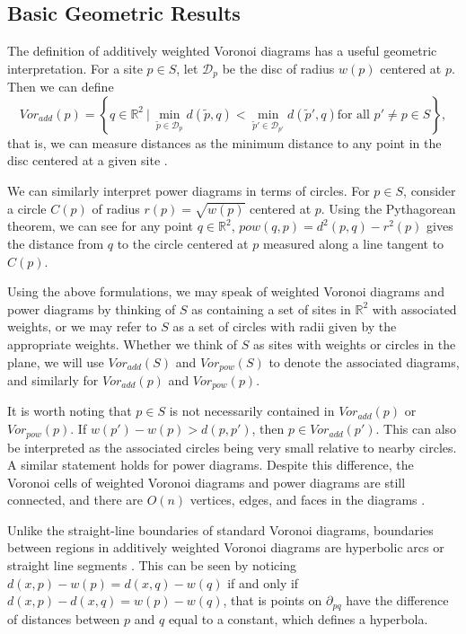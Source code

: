 \documentclass[a4paper, 11pt]{article}
\newcommand{\R}{\mathbb{R}}
\begin{document}
\subsection{Basic Geometric Results}
\label{sec:basic_geom}

The definition of additively weighted Voronoi diagrams has a useful geometric interpretation. For a site $p \in S$, let $\mathcal{D}_p$ be the disc of radius $w(p)$ centered at $p$. Then we
can define
\begin{equation*}
  Vor_{add}(p) = \left\{ q \in \R^2 \ | \ \min_{\tilde{p} \in \mathcal{D}_p} d(\tilde{p}, q) < \min_{\tilde{p}' \in \mathcal{D}_{p'}} d(\tilde{p}', q) \text{
  for all } p' \neq p \in S \right\},
\end{equation*}
that is, we can measure distances as the minimum distance to any point in the disc centered at a given site \cite{rosenberger_additive}.

We can similarly interpret power diagrams in terms of circles. For $p \in S$, consider a circle $C(p)$ of radius $r(p) = \sqrt{w(p)}$ centered at $p$. Using the
Pythagorean theorem, we can see for any point $q \in \R^2$, $pow(q,p) = d^2(p,q) - r^2(p)$ gives the distance from $q$ to the circle centered at $p$
measured along a line tangent to $C(p)$.

Using the above formulations, we may speak of weighted Voronoi diagrams and power diagrams by thinking of $S$ as
containing a set of sites in $\R^2$ with associated weights, or we may refer to $S$ as a set of circles with radii given by the appropriate weights.
Whether we think of $S$ as sites with weights or circles in the plane, we will use $Vor_{add}(S)$ and $Vor_{pow}(S)$ to denote the
associated diagrams, and similarly for $Vor_{add}(p)$ and $Vor_{pow}(p)$.

It is worth noting that $p \in S$ is not necessarily contained in $Vor_{add}(p)$ or $Vor_{pow}(p)$. If $w(p') - w(p) > d(p,p')$, then $p \in
Vor_{add}(p')$. This can also be interpreted as the associated circles being very small relative to nearby circles. A similar statement holds for power diagrams.
Despite this difference, the Voronoi cells of weighted Voronoi diagrams and power diagrams are still connected, and there are $O(n)$ vertices, edges,
and faces in the diagrams \cite{aurenhammer_power} \cite{rosenberger_additive}.

Unlike the straight-line boundaries of standard
Voronoi diagrams, boundaries between regions in additively weighted Voronoi diagrams are hyperbolic arcs or straight line segments
\cite{aurenhammer_additive}. This can be seen by noticing $d(x,p) - w(p) = d(x,q) - w(q)$ if and only if $d(x,p) - d(x,q) = w(p) - w(q)$, that is
points on $\partial_{pq}$ have the difference of distances between $p$ and $q$ equal to a constant, which defines a hyperbola.
\end{document}
